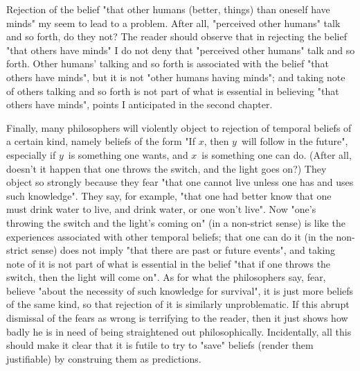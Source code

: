 \documentclass[10pt,twoside,draft]{memoir}
\newcommand{\x}{$x$}
\newcommand{\y}{$y$}
\begin{document}
{Rejection of the belief "that other humans (better, things) than oneself 
have minds" my seem to lead to a problem. After all, "perceived other 
humans" talk and so forth, do they not? The reader should observe that in 
rejecting the belief "that others have minds" I do not deny that "perceived 
other humans" talk and so forth. Other humans' talking and so forth is 
associated with the belief "that others have minds", but it is not "other 
humans having minds"; and taking note of others talking and so forth is not 
part of what is essential in believing "that others have minds", points I 
anticipated in the second chapter. 

Finally, many philosophers will violently object to rejection of 
temporal beliefs of a certain kind, namely beliefs of the form "If \x, then \y\ 
will follow in the future", especially if \y\ is something one wants, and \x\ is 
something one can do. (After all, doesn't it happen that one throws the 
switch, and the light goes on?) They object so strongly because they fear 
"that one cannot live unless one has and uses such knowledge". They say, 
for example, "that one had better know that one must drink water to live, 
and drink water, or one won't live". Now "one's throwing the switch and the 
light's coming on" (in a non-strict sense) is like the experiences associated 
with other temporal beliefs; that one can do it (in the non-strict sense) does 
not imply "that there are past or future events", and taking note of it is not 
part of what is essential in the belief "that if one throws the switch, then the 
light will come on". As for what the philosophers say, fear, believe "about 
the necessity of such knowledge for survival", it is just more beliefs of the 
same kind, so that rejection of it is similarly unproblematic. If this abrupt 
dismissal of the fears as wrong is terrifying to the reader, then it just shows 
how badly he is in need of being straightened out philosophically. 
Incidentally, all this should make it clear that it is futile to try to "save" 
beliefs (render them justifiable) by construing them as predictions. 

}
\end{document}
